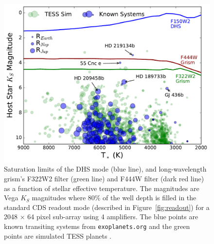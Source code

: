 \documentclass[iop]{emulateapj}
\begin{document}
\begin{figure}[!h]
\includegraphics[width=1.0\columnwidth]{brightness_scape.pdf}
\caption{Saturation limits of the DHS mode (blue line), and long-wavelength grism's F322W2 filter (green line) and F444W filter (dark red line) as a function of stellar effective temperature.
The magnitudes are Vega $K_S$ magnitudes where 80\% of the well depth is filled in the standard CDS readout mode (described in Figure~\ref{fig:readout}) for a 2048 $\times$ 64 pixel sub-array using 4 amplifiers.
The blue points are known transiting systems from \texttt{exoplanets.org} and the green points are simulated TESS planets \citep{sullivan2015tess}.}\label{fig:saturationLim}
\end{figure}

\end{document}
